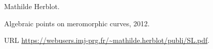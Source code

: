 Mathilde Herblot.

\newblock Algebraic points on meromorphic curves, 2012.

\newblock URL \url{https://webusers.imj-prg.fr/~mathilde.herblot/publi/SL.pdf}.
